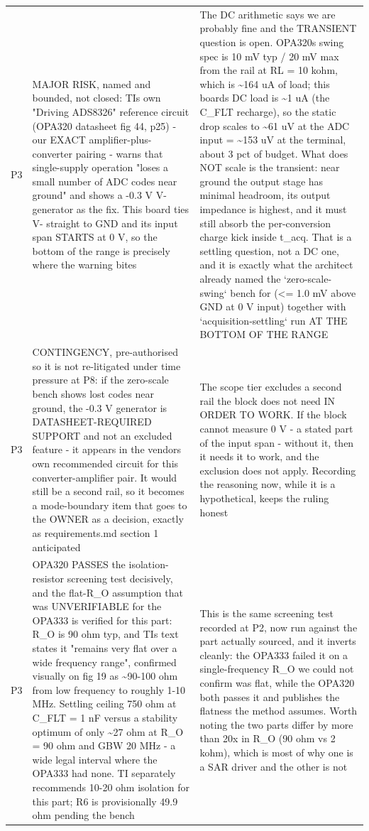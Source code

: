 \documentclass[11pt,a4paper]{article}
\begin{document}
{\begin{longtable}{lp{5.2cm}p{7.2cm}}
P3 & MAJOR RISK, named and bounded, not closed: TIs own "Driving ADS8326" reference circuit (OPA320 datasheet fig 44, p25) - our EXACT amplifier-plus-converter pairing - warns that single-supply operation "loses a small number of ADC codes near ground" and shows a -0.3 V V- generator as the fix. This board ties V- straight to GND and its input span STARTS at 0 V, so the bottom of the range is precisely where the warning bites & The DC arithmetic says we are probably fine and the TRANSIENT question is open. OPA320s swing spec is 10 mV typ / 20 mV max from the rail at RL = 10 kohm, which is \textasciitilde{}164 uA of load; this boards DC load is \textasciitilde{}1 uA (the C\_FLT recharge), so the static drop scales to \textasciitilde{}61 uV at the ADC input = \textasciitilde{}153 uV at the terminal, about 3 pct of budget. What does NOT scale is the transient: near ground the output stage has minimal headroom, its output impedance is highest, and it must still absorb the per-conversion charge kick inside t\_acq. That is a settling question, not a DC one, and it is exactly what the architect already named the `zero-scale-swing` bench for (\textless{}= 1.0 mV above GND at 0 V input) together with `acquisition-settling` run AT THE BOTTOM OF THE RANGE \\
P3 & CONTINGENCY, pre-authorised so it is not re-litigated under time pressure at P8: if the zero-scale bench shows lost codes near ground, the -0.3 V generator is DATASHEET-REQUIRED SUPPORT and not an excluded feature - it appears in the vendors own recommended circuit for this converter-amplifier pair. It would still be a second rail, so it becomes a mode-boundary item that goes to the OWNER as a decision, exactly as requirements.md section 1 anticipated & The scope tier excludes a second rail the block does not need IN ORDER TO WORK. If the block cannot measure 0 V - a stated part of the input span - without it, then it needs it to work, and the exclusion does not apply. Recording the reasoning now, while it is a hypothetical, keeps the ruling honest \\
P3 & OPA320 PASSES the isolation-resistor screening test decisively, and the flat-R\_O assumption that was UNVERIFIABLE for the OPA333 is verified for this part: R\_O is 90 ohm typ, and TIs text states it "remains very flat over a wide frequency range", confirmed visually on fig 19 as \textasciitilde{}90-100 ohm from low frequency to roughly 1-10 MHz. Settling ceiling 750 ohm at C\_FLT = 1 nF versus a stability optimum of only \textasciitilde{}27 ohm at R\_O = 90 ohm and GBW 20 MHz - a wide legal interval where the OPA333 had none. TI separately recommends 10-20 ohm isolation for this part; R6 is provisionally 49.9 ohm pending the bench & This is the same screening test recorded at P2, now run against the part actually sourced, and it inverts cleanly: the OPA333 failed it on a single-frequency R\_O we could not confirm was flat, while the OPA320 both passes it and publishes the flatness the method assumes. Worth noting the two parts differ by more than 20x in R\_O (90 ohm vs 2 kohm), which is most of why one is a SAR driver and the other is not \\

\end{longtable}}
\end{document}

